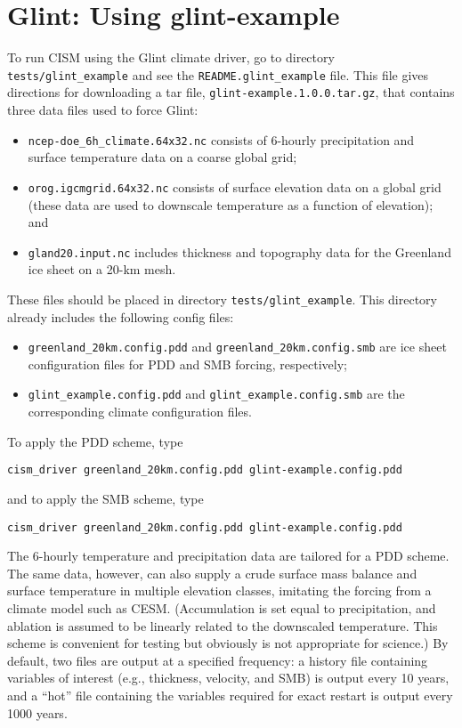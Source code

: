 \section{Glint: Using glint-example}
\label{ug.use_glint}
To run CISM using the Glint climate driver, go to directory \texttt{tests/glint\_example} 
and see the \texttt{README.glint\_example} file.
This file gives directions for downloading a tar file,
\texttt{glint-example.1.0.0.tar.gz}, that contains three data files
used to force Glint:
%
\begin{itemize}
\item \texttt{ncep-doe\_6h\_climate.64x32.nc} consists of 6-hourly precipitation and
surface temperature data on a coarse global grid;
\item \texttt{orog.igcmgrid.64x32.nc} consists of surface elevation data on a global grid
(these data are used to downscale temperature as a function of elevation); and
\item \texttt{gland20.input.nc} includes thickness and topography data for the Greenland 
ice sheet on a 20-km mesh.
\end{itemize}
%
These files should be placed in directory \texttt{tests/glint\_example}. 
This directory already includes the following config files:
\begin{itemize}
\item \texttt{greenland\_20km.config.pdd} and \texttt{greenland\_20km.config.smb} are
ice sheet configuration files for PDD and SMB forcing, respectively;
\item \texttt{glint\_example.config.pdd} and \texttt{glint\_example.config.smb} are the
corresponding climate configuration files.
\end{itemize}

To apply the PDD scheme, type
\begin{verbatim}
cism_driver greenland_20km.config.pdd glint-example.config.pdd
\end{verbatim}
%
and to apply the SMB scheme, type
\begin{verbatim}
cism_driver greenland_20km.config.pdd glint-example.config.pdd
\end{verbatim}
%
The 6-hourly temperature and precipitation data 
are tailored for a PDD scheme.  The same data, however, can also supply a crude
surface mass balance and surface temperature in multiple elevation classes, imitating
the forcing from a climate model such as CESM.  (Accumulation is set equal to precipitation,
and ablation is assumed to be linearly related to the downscaled temperature.
This scheme is convenient for testing but obviously is not appropriate for science.)
By default, two files are output at a specified frequency: a history file
containing variables of interest (e.g., thickness, velocity, and SMB) is output every 10 years,
and a ``hot'' file containing the variables required for exact restart is output every 1000 years.
 
